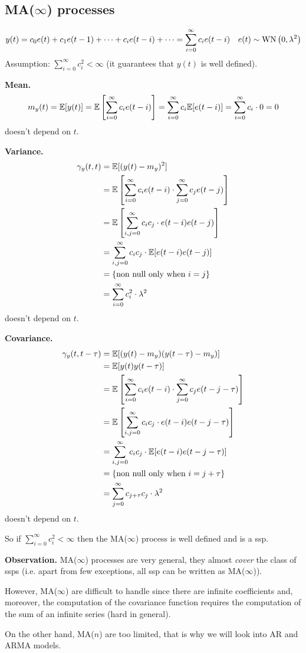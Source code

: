 \subsection{MA(\texorpdfstring{$\infty$}{infinity}) processes}

\[
	y(t)=c_{0} e(t)+c_{1} e(t-1)+\cdots+c_{i} e(t-i)+\cdots=\sum_{i=0}^{\infty} c_{i} e(t-i) \quad e(t) \sim \operatorname{WN}\left(0, \lambda^{2}\right)
\]
Assumption: $\sum_{i=0}^{\infty} c_{i}^{2}<\infty$ (it guarantees that $y(t)$ is well defined).

\textbf{Mean.}
\[
	m_{y}(t)=\mathbb{E}[y(t)]=\mathbb{E}\left[\sum_{i=0}^{\infty} c_{i} e(t-i)\right]=\sum_{i=0}^{\infty} c_{i} \mathbb{E}[e(t-i)]=\sum_{i=0}^{\infty} c_{i} \cdot 0=0
\]
doesn't depend on $t$.

\textbf{Variance.}
\begin{align*}
	\gamma_{y}(t, t)&=\mathbb{E}[(y(t)-m_{y})^{2}]\\
	&=\mathbb{E}\left[\sum_{i=0}^{\infty} c_{i} e(t-i) \cdot \sum_{j=0}^{\infty} c_{j} e(t-j)\right]\\
	&=\mathbb{E}\left[\sum_{i, j=0}^{\infty} c_{i} c_{j} \cdot e(t-i) e(t-j)\right]\\
	&=\sum_{i, j=0}^{\infty} c_{i} c_{j} \cdot \mathbb{E}[e(t-i) e(t-j)]\\
	&=\{\text{non null only when }i=j\}\\
	&=\sum_{i=0}^{\infty} c_{i}^2 \cdot\lambda^2 
\end{align*}
doesn't depend on $t$.

\textbf{Covariance.}
\begin{align*}
	\gamma_{y}(t, t-\tau) &=\mathbb{E}[(y(t)-m_{y}) (y(t-\tau)-m_{y})]\\
	&=\mathbb{E}[y(t) y(t-\tau)]\\
	&=\mathbb{E}\left[\sum_{i=0}^{\infty} c_{i} e(t-i) \cdot \sum_{j=0}^{\infty} c_{j} e(t-j-\tau)\right]\\
	&=\mathbb{E}\left[\sum_{i, j=0}^{\infty} c_{i} c_{j} \cdot e(t-i) e(t-j-\tau)\right]\\
	&=\sum_{i, j=0}^{\infty} c_{i} c_{j} \cdot \mathbb{E}[e(t-i) e(t-j-\tau)]\\
	&=\{\text{non null only when }i=j+\tau\}\\
	&=\sum_{j=0}^{\infty} c_{j+\tau}c_{j}\cdot\lambda^2 
\end{align*}
doesn't depend on $t$.

So if $\sum_{i=0}^{\infty} c_{i}^{2}<\infty$ then the MA($\infty $) process is well defined and is a \gls{ssp}.

\textbf{Observation.} MA($\infty$) processes are very general, they almost \emph{cover} the class of \glspl{ssp} (i.e. apart from few exceptions, all \gls{ssp} can be written as MA($\infty$)).

However, MA($\infty$) are difficult to handle since there are infinite coefficients and, moreover, the computation of the covariance function requires the computation of the sum of an infinite series (hard in general).

On the other hand, MA($n$) are too limited, that is why we will look into AR and ARMA models.